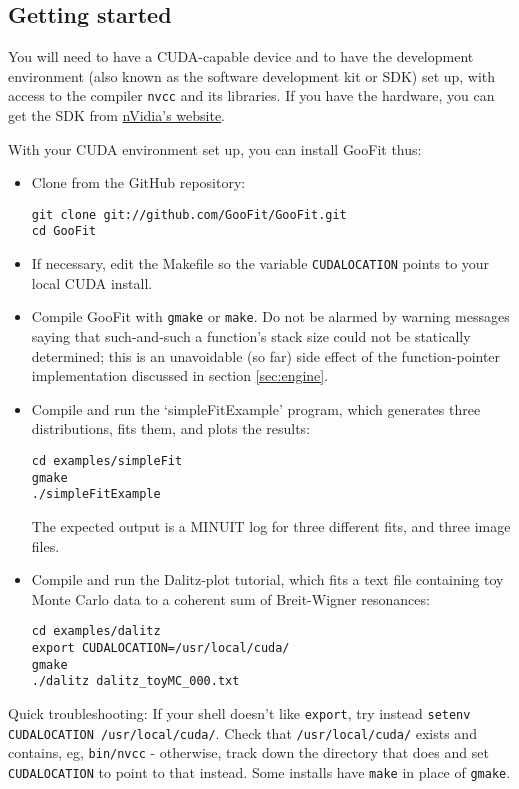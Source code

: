 \documentclass[12pt,pdflatex]{article}
\begin{document}
\subsection{Getting started}

You will need to have a CUDA-capable device and to have the development
environment (also known as the software development kit or SDK) 
set up, with access to the compiler \texttt{nvcc} and its libraries.
If you have the hardware, you can get the SDK 
from \href{https://developer.nvidia.com/gpu-computing-sdk}{nVidia's website}.

With your CUDA environment set up, you can install GooFit thus: 
\begin{itemize}
\item Clone from the GitHub repository:
\begin{verbatim}
git clone git://github.com/GooFit/GooFit.git
cd GooFit
\end{verbatim}
\item If necessary, edit the Makefile so the variable \texttt{CUDALOCATION}
points to your local CUDA install.
\item Compile GooFit with \texttt{gmake} or \texttt{make}. Do not be alarmed
by warning messages saying that such-and-such a function's stack size could
not be statically determined; this is an unavoidable (so far) side effect 
of the function-pointer implementation discussed in section \ref{sec:engine}.
\item Compile and run the `simpleFitExample' program, which generates
three distributions, fits them, and plots the results:
\begin{verbatim}
cd examples/simpleFit
gmake
./simpleFitExample
\end{verbatim}
The expected output is a MINUIT log for three different fits, 
and three image files. 
\item Compile and run the Dalitz-plot tutorial, which fits a 
text file containing toy Monte Carlo data to a coherent sum of
Breit-Wigner resonances: 
\begin{verbatim}
cd examples/dalitz
export CUDALOCATION=/usr/local/cuda/
gmake
./dalitz dalitz_toyMC_000.txt
\end{verbatim}
\end{itemize}

Quick troubleshooting: If your shell doesn't like \texttt{export},
try instead \verb|setenv CUDALOCATION /usr/local/cuda/|. Check
that \verb|/usr/local/cuda/| exists and contains, eg, \verb|bin/nvcc| - 
otherwise, track down the directory that does and set \verb|CUDALOCATION|
to point to that instead. Some installs have \verb|make| in place of \verb|gmake|. 
\end{document}
